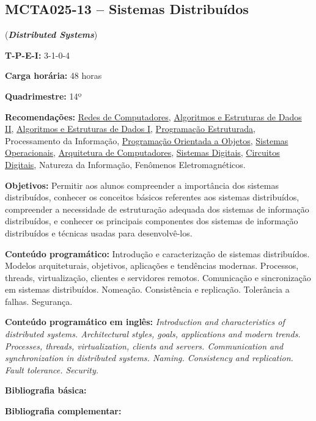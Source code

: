 \documentclass[class=article, crop=false]{standalone}
\begin{document}
\subsection*{MCTA025-13 -- Sistemas Distribuídos}
\label{disc:sist_distr}

(\textbf{\textit{Distributed Systems}})

\begin{center}
\begin{minipage}{0.85\textwidth}
    \textbf{T-P-E-I:} 3-1-0-4
    
    \textbf{Carga horária:} 48 horas
    
    \textbf{Quadrimestre:} 14º
    
    \textbf{Recomendações:} 
    \hyperref[disc:redes]{Redes de Computadores},
    \hyperref[disc:aedII]{Algoritmos e Estruturas de Dados II},
    \hyperref[disc:aedI]{Algoritmos e Estruturas de Dados I},
    \hyperref[disc:pe]{Programação Estruturada},
    Processamento da Informação, 
    \hyperref[disc:poo]{Programação Orientada a Objetos},
    \hyperref[disc:so]{Sistemas Operacionais},
    \hyperref[disc:arq]{Arquitetura de Computadores},
    \hyperref[disc:sist_dig]{Sistemas Digitais},
    \hyperref[disc:circ_dig]{Circuitos Digitais},
    Natureza da Informação,
    Fenômenos Eletromagnéticos.
\end{minipage}
\end{center}

\textbf{Objetivos:}
Permitir aos alunos compreender a importância dos sistemas distribuídos,
conhecer os conceitos básicos referentes aos sistemas distribuídos, compreender
a necessidade de estruturação adequada dos sistemas de informação distribuídos,
e conhecer os principais componentes dos sistemas de informação distribuídos e
técnicas usadas para desenvolvê-los. 

\textbf{Conteúdo programático:}
Introdução e caracterização de sistemas distribuídos. 
Modelos arquiteturais, objetivos, aplicações e tendências modernas. 
Processos, threads, virtualização, clientes e servidores remotos. 
Comunicação e sincronização em sistemas distribuídos. 
Nomeação. 
Consistência e replicação. 
Tolerância a falhas. 
Segurança.

\textbf{Conteúdo programático em inglês:}
\textit{Introduction and characteristics of distributed systems. 
Architectural styles, goals, applications and modern trends. 
Processes, threads, virtualization, clients and servers. 
Communication and synchronization in distributed systems. 
Naming. 
Consistency and replication. 
Fault tolerance. 
Security.}


\newrefsection
\textbf{Bibliografia básica:}
\nocite{2007-tanenbaum, 2005-coulouris, 2007-ghosh}
\printbibliography

\newrefsection
\textbf{Bibliografia complementar:}
\nocite{2009-tanenbaum, 2006-ben, 2008-kshemkalyani, 1997-lynch, 2017-tanenbaum}
\printbibliography
\end{document}
